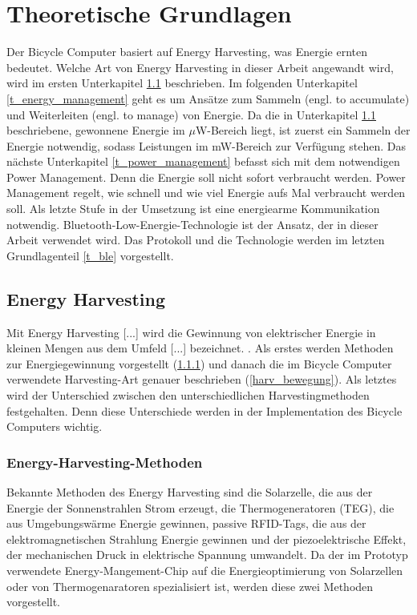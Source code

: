 \chapter{Theoretische Grundlagen}

Der Bicycle Computer basiert auf Energy Harvesting, was Energie ernten bedeutet. Welche Art von Energy Harvesting in dieser Arbeit angewandt wird, wird im ersten Unterkapitel \ref{t_harvesting} beschrieben. Im folgenden Unterkapitel \ref{t_energy_management} geht es um Ansätze zum Sammeln (engl. to accumulate) und Weiterleiten (engl. to manage) von Energie. Da die in Unterkapitel \ref{t_harvesting} beschriebene, gewonnene Energie im $\mu$W-Bereich liegt, ist zuerst ein Sammeln der Energie notwendig, sodass Leistungen im mW-Bereich zur Verfügung stehen. Das nächste Unterkapitel \ref{t_power_management} befasst sich mit dem notwendigen Power Management. Denn die
Energie soll nicht sofort verbraucht werden. Power Management regelt, wie schnell und wie viel Energie aufs Mal verbraucht werden soll. Als letzte Stufe in der Umsetzung ist eine energiearme Kommunikation notwendig. Bluetooth-Low-Energie-Technologie ist der Ansatz, der in dieser Arbeit verwendet wird. Das Protokoll und die Technologie werden im letzten Grundlagenteil \ref{t_ble} vorgestellt.


\section{Energy Harvesting}\label{t_harvesting} 

\glqq Mit Energy Harvesting [...] wird die Gewinnung von elektrischer Energie in kleinen Mengen aus dem Umfeld [...] bezeichnet.\grqq {} \cite{harvesting}. Als erstes werden Methoden zur Energiegewinnung vorgestellt (\ref{harv_arten}) und danach die im Bicycle Computer verwendete Harvesting-Art genauer beschrieben (\ref{harv_bewegung}). Als letztes wird der Unterschied zwischen den unterschiedlichen Harvestingmethoden festgehalten. Denn diese Unterschiede werden in der Implementation des Bicycle Computers wichtig.


\subsection{Energy-Harvesting-Methoden}\label{harv_arten} 

Bekannte Methoden des Energy Harvesting sind die Solarzelle, die aus der Energie der Sonnenstrahlen Strom erzeugt, die Thermogeneratoren (TEG), die aus Umgebungswärme Energie gewinnen,  passive RFID-Tags, die aus der elektromagnetischen Strahlung Energie gewinnen und der piezoelektrische Effekt, der mechanischen Druck in elektrische Spannung umwandelt. Da der im Prototyp verwendete Energy-Mangement-Chip \cite{datasheet_EM85} auf die Energieoptimierung von Solarzellen oder von Thermogenaratoren spezialisiert ist, werden diese zwei Methoden vorgestellt. 


